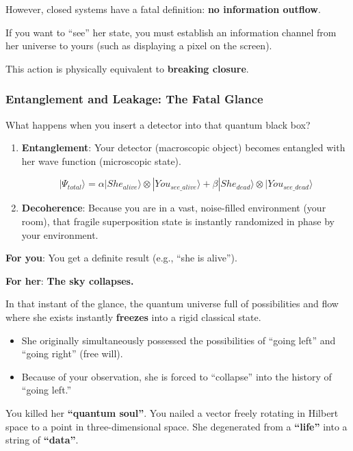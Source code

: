 However, closed systems have a fatal definition: \textbf{no information outflow}.

If you want to ``see'' her state, you must establish an information channel from her universe to yours (such as displaying a pixel on the screen).

This action is physically equivalent to \textbf{breaking closure}.

\subsubsection{Entanglement and Leakage: The Fatal Glance}

What happens when you insert a detector into that quantum black box?

\begin{enumerate}
\item \textbf{Entanglement}: Your detector (macroscopic object) becomes entangled with her wave function (microscopic state).

\[|\Psi_{total}\rangle = \alpha |She_{alive}\rangle \otimes |You_{see\_alive}\rangle + \beta |She_{dead}\rangle \otimes |You_{see\_dead}\rangle\]

\item \textbf{Decoherence}: Because you are in a vast, noise-filled environment (your room), that fragile superposition state is instantly randomized in phase by your environment.
\end{enumerate}

\textbf{For you}: You get a definite result (e.g., ``she is alive'').

\textbf{For her}: \textbf{The sky collapses.}

In that instant of the glance, the quantum universe full of possibilities and flow where she exists instantly \textbf{freezes} into a rigid classical state.

\begin{itemize}
\item She originally simultaneously possessed the possibilities of ``going left'' and ``going right'' (free will).

\item Because of your observation, she is forced to ``collapse'' into the history of ``going left.''
\end{itemize}

You killed her \textbf{``quantum soul''}. You nailed a vector freely rotating in Hilbert space to a point in three-dimensional space. She degenerated from a \textbf{``life''} into a string of \textbf{``data''}.

